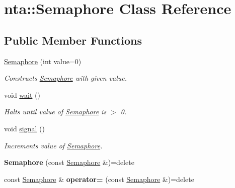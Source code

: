 \hypertarget{classnta_1_1Semaphore}{}\section{nta\+:\+:Semaphore Class Reference}
\label{classnta_1_1Semaphore}
\subsection*{Public Member Functions}
\begin{DoxyCompactItemize}
\item 
\mbox{\label{classnta_1_1Semaphore_a848064c02cd79a9ef556c62bec24f62c}} 
\hyperlink{classnta_1_1Semaphore_a848064c02cd79a9ef556c62bec24f62c}{Semaphore} (int value=0)
\begin{DoxyCompactList}\small\item\em Constructs \hyperlink{classnta_1_1Semaphore}{Semaphore} with given value. \end{DoxyCompactList}\item 
\mbox{\label{classnta_1_1Semaphore_a725ef6b8274925ee6074dd4e90bfb4d5}} 
void \hyperlink{classnta_1_1Semaphore_a725ef6b8274925ee6074dd4e90bfb4d5}{wait} ()
\begin{DoxyCompactList}\small\item\em Halts until value of \hyperlink{classnta_1_1Semaphore}{Semaphore} is $>$ 0. \end{DoxyCompactList}\item 
\mbox{\label{classnta_1_1Semaphore_a2715d1fc51becdfe7d3edd4e256589c4}} 
void \hyperlink{classnta_1_1Semaphore_a2715d1fc51becdfe7d3edd4e256589c4}{signal} ()
\begin{DoxyCompactList}\small\item\em Increments value of \hyperlink{classnta_1_1Semaphore}{Semaphore}. \end{DoxyCompactList}\item 
\mbox{\label{classnta_1_1Semaphore_ac1f38b663a5feff048984dc3070ef2d9}} 
{\bfseries Semaphore} (const \hyperlink{classnta_1_1Semaphore}{Semaphore} \&)=delete
\item 
\mbox{\label{classnta_1_1Semaphore_a3113e9fcb955786ed3fbec4b6e3cb603}} 
const \hyperlink{classnta_1_1Semaphore}{Semaphore} \& {\bfseries operator=} (const \hyperlink{classnta_1_1Semaphore}{Semaphore} \&)=delete
\end{DoxyCompactItemize}
